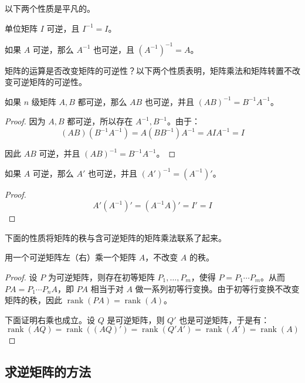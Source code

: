 以下两个性质是平凡的。

\begin{theorem}
	单位矩阵 $I$ 可逆，且 $I^{-1} = I$。
\end{theorem}

\begin{theorem}
	如果 $A$ 可逆，那么 $A^{-1}$ 也可逆，且 $(A^{-1})^{-1} = A$。
\end{theorem}

矩阵的运算是否改变矩阵的可逆性？以下两个性质表明，矩阵乘法和矩阵转置不改变可逆矩阵的可逆性。

\begin{theorem}
	如果 $n$ 级矩阵 $A, B$ 都可逆，那么 $AB$ 也可逆，并且 $(AB)^{-1} = B^{-1} A^{-1}$。
\end{theorem}

\begin{proof}
	因为 $A, B$ 都可逆，所以存在 $A^{-1}, B^{-1}$。由于：
	$$
	(AB)(B^{-1}A^{-1}) = A(BB^{-1})A^{-1} = AIA^{-1} = I
	$$

	因此 $AB$ 可逆，并且 $(AB)^{-1} = B^{-1} A^{-1}$。
\end{proof}

\begin{theorem}
	如果 $A$ 可逆，那么 $A'$ 也可逆，并且 $(A')^{-1} = (A^{-1})'$。
\end{theorem}

\begin{proof}
	$$
	A'(A^{-1})' = (A^{-1} A)' = I' = I
	$$
\end{proof}

下面的性质将矩阵的秩与含可逆矩阵的矩阵乘法联系了起来。

\begin{theorem}
	用一个可逆矩阵左（右）乘一个矩阵 $A$，不改变 $A$ 的秩。
\end{theorem}

\begin{proof}
	设 $P$ 为可逆矩阵，则存在初等矩阵 $P_1, \ldots, P_m$，使得 $P = P_1 \cdots P_m$。从而 $PA = P_1 \cdots P_n A$，即 $PA$ 相当于对 $A$ 做一系列初等行变换。由于初等行变换不改变矩阵的秩，因此 $\operatorname{rank}(PA) = \operatorname{rank}(A)$。

	下面证明右乘也成立。设 $Q$ 是可逆矩阵，则 $Q'$ 也是可逆矩阵，于是有：
	$$
	\operatorname{rank}(AQ) = \operatorname{rank}((AQ)') = \operatorname{rank}(Q'A') = \operatorname{rank}(A') = \operatorname{rank}(A)
	$$
\end{proof}

\subsection{求逆矩阵的方法}

